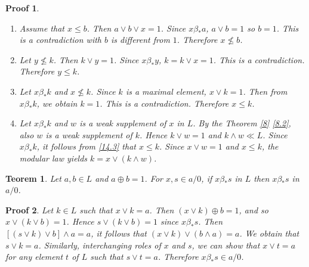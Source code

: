 \documentclass[a4paper,12pt]{article}
\numberwithin{equation}{section}
\theoremstyle{italik}
\newtheorem{teorem}{Teorem}[section]
\newtheorem*{ispat}{Proof}
\begin{document}
\begin{ispat}
    \begin{enumerate}
        \item
            Assume that $ x \leq b $. Then $ a \vee b \vee x = 1 $. Since $ x \beta_* a $, $ a \vee b = 1 $ so $ b = 1 $. 
            This is a contradiction with $ b $ is different from $ 1 $. 
            Therefore $ x \not\le b $.
        \item
            Let $ y \not\le k $. Then $ k \vee y = 1 $. Since $ x \beta_* y $, $ k = k \vee x = 1 $. This is a contradiction. 
            Therefore $ y \leq k $.
        \item
            Let $ x \beta_* k $ and $ x \not\le k $. Since $ k $ is a maximal element, $ x \vee k = 1 $. Then from $ x \beta_* k $, 
            we obtain $ k = 1 $. This is a contradiction. Therefore $ x \leq k $.
        \item
            Let $ x \beta_* k $ and $ w $ is a weak supplement of $ x $ in $ L $. By the Theorem \ref{8} \ref{8.2}, 
            also $ w $ is a weak supplement of $ k $. Hence $ k \vee w = 1 $ and $ k \wedge w \ll L $. 
            Since $ x \beta_* k $, it follows from \ref{14.3} that $ x \leq k $. Since $ x \vee w = 1 $ 
            and $ x \leq k $, the modular law yields $ k = x \vee ( k \wedge w ) $.
    \end{enumerate}
\end{ispat}


\begin{teorem}
    Let $ a, b \in L $ and $ a \oplus b = 1 $. For $ x,s \in a/0 $, if $ x \beta_* s $ in $ L $ then $ x \beta_* s $ in $ a/0 $.
\end{teorem}

\begin{ispat}
    Let $ k \in L $ such that $ x \vee k = a $. Then $ (x \vee k ) \oplus b = 1 $, and so $ x \vee ( k \vee b ) = 1 $. 
    Hence $ s \vee ( k \vee b ) = 1 $ since $ x \beta_* s $. Then $ \left[ (s \vee k ) \vee b \right] \wedge a = a $, 
    it follows that $ ( x \vee k ) \vee ( b \wedge a ) = a $. We obtain that $ s \vee k = a $. Similarly, interchanging 
    roles of $ x $ and $ s $, we can show that $ x \vee t = a $ for any element $ t $ of $ L $ such that $ s \vee t = a $. 
    Therefore $ x \beta_* s \in a/0 $.
\end{ispat}
\end{document}
